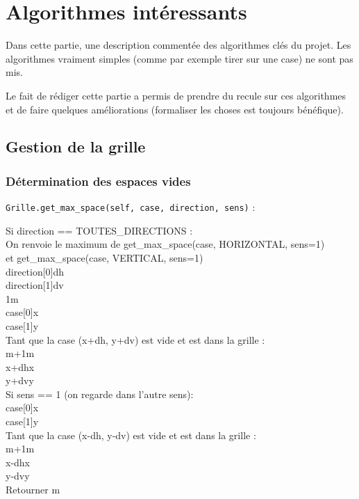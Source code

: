 \chapter{Algorithmes intéressants}\label{algo_liste}
Dans cette partie, une description commentée des algorithmes clés du projet. Les algorithmes vraiment simples (comme par exemple tirer sur une case) ne sont pas mis.

Le fait de rédiger cette partie a permis de prendre du recule sur ces algorithmes et de faire quelques améliorations (formaliser les choses est toujours bénéfique).
\section{Gestion de la grille}


\subsection{Détermination des espaces vides}\label{get_max_space}
\texttt{Grille.get\_max\_space(self, case, direction, sens)} :
\begin{algo1}
Si direction == TOUTES\_DIRECTIONS :\\
 On renvoie le maximum de get\_max\_space(case, HORIZONTAL, sens=1)\\
 et get\_max\_space(case, VERTICAL, sens=1)\\
direction[0]\sto dh\\
direction[1]\sto dv\\
1\sto m\\
case[0]\sto x\\
case[1]\sto y\\
Tant que la case (x+dh, y+dv) est vide et est dans la grille :\\
m+1\sto m\\
x+dh\sto x\\
y+dv\sto y\\
Si sens == 1 (on regarde dans l'autre sens):\\
case[0]\sto x\\
case[1]\sto y\\
Tant que la case (x-dh, y-dv) est vide et est dans la grille :\\
m+1\sto m\\
x-dh\sto x\\
y-dv\sto y\\
Retourner m\\
\end{algo1}

